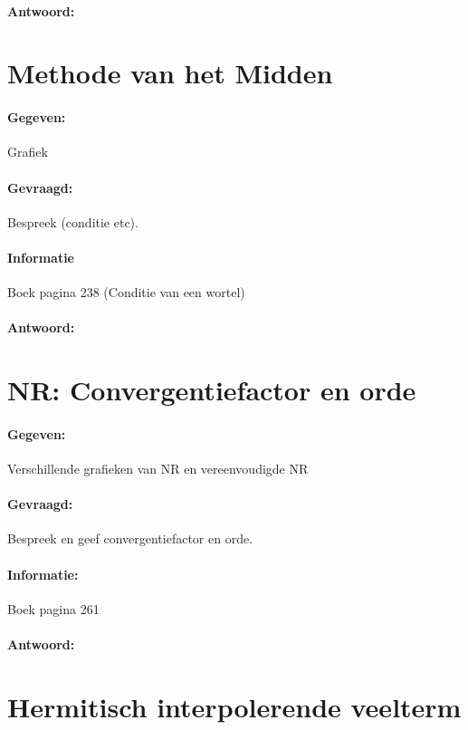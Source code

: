 \documentclass[12pt]{article}
\begin{document}
\paragraph{Antwoord:}

\newpage

\section{Methode van het Midden}
\paragraph{Gegeven:} Grafiek
\paragraph{Gevraagd:} Bespreek (conditie etc).
\paragraph{Informatie} Boek pagina 238 (Conditie van een wortel)
\paragraph{Antwoord:}

\newpage

\section{NR: Convergentiefactor en orde}
\paragraph{Gegeven:} Verschillende grafieken van NR en vereenvoudigde NR
\paragraph{Gevraagd:} Bespreek en geef convergentiefactor en orde.
\paragraph{Informatie:} Boek pagina 261
\paragraph{Antwoord:}

\newpage

\section{Hermitisch interpolerende veelterm}
\end{document}
